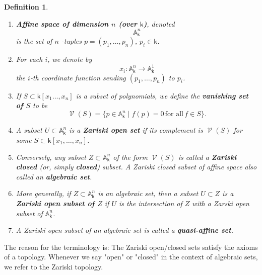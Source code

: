 \documentclass[11pt]{article}
\newcommand{\A}{\mathbb{A}}
\renewcommand{\k}{\mathsf{k}}
\renewcommand{\to}{\longrightarrow}
\DeclareMathOperator{\V}{\mathcal{V}}
\newcommand{\A}{\mathbb A}
\renewcommand{\k}{\mathsf{k}}
\renewcommand{\to}{{\longrightarrow}}
\newtheorem{definition}{Definition}[section]
\begin{document}
\begin{definition}
\begin{enumerate}
\item \textbf{\emph{Affine space of dimension \(n\) (over \(\k\))}}, denoted \[\A^{n}_{\k}\] is the set of \(n\) -tuples \(p = (p_1, \dots, p_{n})\), \(p_{i} \in \k\).
\item For each \(i\), we denote by \[x_{i}: \A^{n}_{\k} \to \A^{1}_{\k}\] the \(i\)-th coordinate function sending \((p_{1}, \dots, p_{n})\) to \(p_i\).
\item If \(S \subset \k[x_{1} \dots, x_n]\) is a subset of polynomials, we define the \textbf{\emph{vanishing set of \(S\)}} to be
\[\V(S) = \big\{p \in \A^n_{\k} \mid f(p)=0 \, \textrm{for all}\, f \in S \big\}.\]
\item A subset \(U \subset \A^{n}_{\k}\) is a \textbf{\emph{Zariski open set}} if its complement is \(\V(S)\) for some \(S \subset \k[x_1, \dots, x_n]\).
\item Conversely, any subset \(Z \subset \A^n_{\k}\) of the form \(\V(S)\) is called a \textbf{\emph{Zariski closed}} (or, simply \textbf{\emph{closed}}) subset. A Zariski closed subset of affine space also called an \textbf{\emph{algebraic set}}.
\item More generally, if \(Z \subset \A^n_{\k}\) is an algebraic set, then a subset \(U \subset Z\) is  a \textbf{\emph{Zariski open  subset of \(Z\)}} if \(U\) is the intersection of \(Z\) with a Zarski open subset of \(\A^n_{\k}\).
\item A Zariski open subset of an algebraic set is called a \textbf{\emph{quasi-affine set}}.
\end{enumerate}
\end{definition}

The reason for the terminology is: The Zariski open/closed sets satisfy the axioms of a topology.  Whenever we say "open" or "closed" in the context of algebraic sets, we refer to the Zariski topology.  
\end{document}
